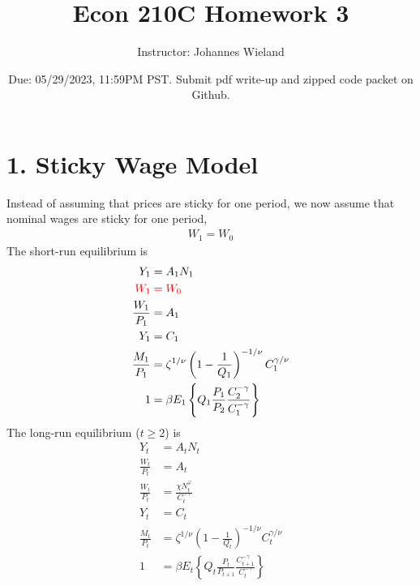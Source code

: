 \documentclass{article}
\newcommand{\1}{\mathbf{1}}
\begin{document}
\title{Econ 210C Homework 3}
\author{Instructor: Johannes Wieland}
\date{\color{red} Due: 05/29/2023, 11:59PM PST. Submit pdf write-up and zipped code packet on Github.}
\maketitle

\section*{1. Sticky Wage Model}
Instead of assuming that prices are sticky for one period, we now assume that nominal wages are sticky for one period,
\begin{align*}
	W_1 = W_0
\end{align*}
The short-run equilibrium is
\begin{align*}
	Y_1&=A_1N_{1}  \\
	\color{red}W_1&\color{red}= W_0  \\
	\frac{W_1}{P_1}&=A_1 \\
	Y_1&=C_1 \\
	\frac{M_1}{P_1}&=\zeta^{1/\nu}\left(1-\frac{1}{Q_1}\right)^{-1/\nu}C_{1}^{\gamma/\nu}\\
	1&=\beta E_1\left\{Q_1 \frac{P_1}{P_{2}} \frac{C_{2}^{-\gamma}}{C_{1}^{-\gamma}}\right\} 
\end{align*}
The long-run equilibrium ($t\ge 2$) is
\begin{align*}
	Y_t&=A_tN_{t}  \\
	\frac{W_t}{P_t}&= A_t  \\
	\frac{W_t}{P_t}&=\frac{\chi N_t^\varphi}{C_t^{-\gamma}} \\
	Y_t&=C_t \\
	\frac{M_t}{P_t}&=\zeta^{1/\nu}\left(1-\frac{1}{Q_t}\right)^{-1/\nu}C_{t}^{\gamma/\nu}\\
	1&=\beta E_t\left\{Q_t \frac{P_t}{P_{t+1}} \frac{C_{t+1}^{-\gamma}}{C_{t}^{-\gamma}}\right\} 
\end{align*}
\end{document}
